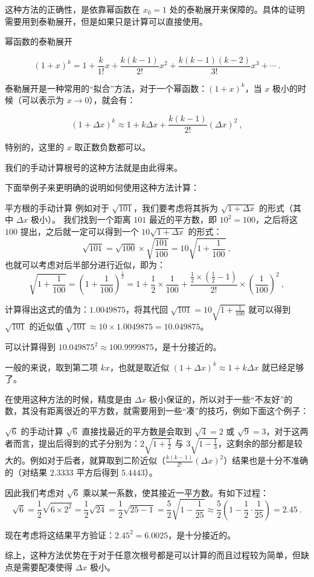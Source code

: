 
这种方法的正确性，是依靠幂函数在 $x_0 = 1$ 处的泰勒展开来保障的。具体的证明需要用到泰勒展开，但是如果只是计算可以直接使用。

\begin{theorem}{幂函数的泰勒展开}

$$(1+x)^k =  1 + \frac{k}{1!} x + \frac{k(k-1)}{2!} x^2 + \frac{k(k-1)(k-2)}{3!} x^3 + \cdots~.$$

\end{theorem}

泰勒展开是一种常用的“拟合”方法，对于一个幂函数：$\left(1+x\right) ^k$，当 $x$ 极小的时候（可以表示为 $x \rightarrow 0$），就会有：

$$(1+\Delta x)^k \approx 1 + k \Delta x + \frac{k(k-1)}{2!}(\Delta x)^2 ~,$$

特别的，这里的 $x$ 取正数负数都可以。

我们的手动计算根号的这种方法就是由此得来。

下面举例子来更明确的说明如何使用这种方法计算：
\begin{example}{平方根的手动计算}
例如对于 $\sqrt{101}$，我们要考虑将其拆为 $\sqrt{1+ \Delta x}$ 的形式（其中 $\Delta x$ 极小）。
我们找到一个距离 $101$ 最近的平方数，即 $10^2 = 100$，之后将这 $100$ 提出，之后就一定可以得到一个 $10 \sqrt{1 + \Delta x}$ 的形式：
$$\sqrt{101} = \sqrt{100} \times \sqrt{\frac{101}{100}}  = 10 \sqrt{1+\frac{1}{100}}~,$$
也就可以考虑对后半部分进行近似，即为：
$$\sqrt{1 + \frac 1{100}} = \left(1 + \frac 1{100}\right)^{\frac 1 2} = 1 + \frac 12 \times \frac 1{100} + \frac{\frac 12 \times (\frac 12 - 1)}{2!} \times \left(\frac 1{100}\right)^2~,$$

计算得出这式的值为：$1.0049875$，将其代回 $\sqrt{101} = 10 \sqrt{1+\frac{1}{100}}$ 就可以得到 $\sqrt{101}$ 的近似值 $\sqrt{101} \approx 10 \times 1.0049875 = 10.049875$。

可以计算得到 $10.049875^2 \approx 100.9999875$，是十分接近的。
\end{example}

一般的来说，取到第二项 $kx$，也就是取近似 $\left(1+\Delta x\right)^k \approx 1 + k \Delta x $ 就已经足够了。

在使用这种方法的时候，精度是由 $\Delta x$ 极小保证的，所以对于一些“不友好”的数，其没有距离很近的平方数，就需要用到一些“凑”的技巧，例如下面这个例子：
\begin{example}{$\sqrt{6}$ 的手动计算}
$\sqrt{6}$ 直接找最近的平方数是会取到 $\sqrt{4}=2$ 或 $\sqrt{9}=3$，对于这两者而言，提出后得到的式子分别为：$2\sqrt{1 + \frac 12}$ 与 $3 \sqrt{1 - \frac 13}$，这剩余的部分都是较大的。例如对于后者，就算取到二阶近似（$\frac{k(k-1)}{2!} (\Delta x)^2$）结果也是十分不准确的（对结果 $2.3333$ 平方后得到 $5.4443$）。

因此我们考虑对 $\sqrt{6}$ 乘以某一系数，使其接近一平方数。有如下过程：
$$\sqrt{6} = \frac 12 \sqrt{6 \times 2^2} = \frac 12 \sqrt{24} = \frac 12 \sqrt{25 - 1} = \frac52 \sqrt{1 - \frac 1{25}} \approx \frac 52 \left(1 - \frac 12 \cdot \frac 1{25}\right) = 2.45~.$$

现在考虑将这结果平方验证：$2.45^2 = 6.0025$，是十分接近的。
\end{example}

综上，这种方法优势在于对于任意次根号都是可以计算的而且过程较为简单，但缺点是需要配凑使得 $\Delta x$ 极小。